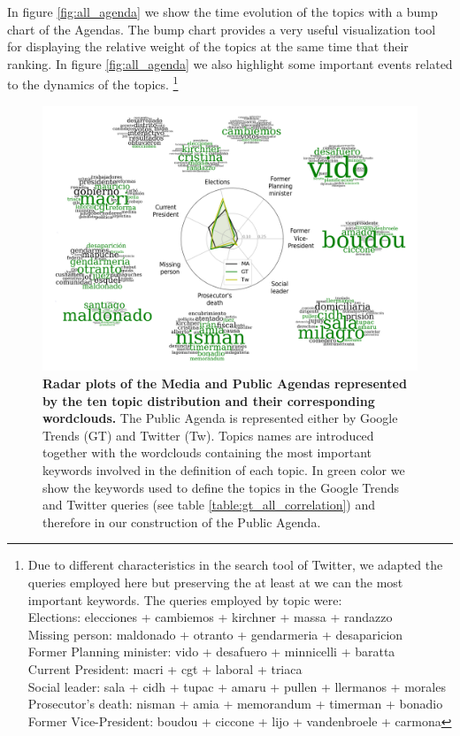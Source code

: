\documentclass[a4paper, 12pt]{article}
\begin{document}
\par In figure \ref{fig:all_agenda} we show the time evolution of the topics with a bump chart of the Agendas. The bump chart provides  a very useful visualization tool for displaying the relative weight of the topics at the same time that their ranking. In figure \ref{fig:all_agenda} we also highlight some important events related to the dynamics of the topics. \footnote{Due to different characteristics in the search tool of Twitter, we adapted the queries employed here but preserving the at least at we can the most important keywords. The queries employed by topic were: \\
Elections: elecciones + cambiemos + kirchner + massa + randazzo \\
Missing person: maldonado + otranto + gendarmeria + desaparicion \\
Former Planning minister: vido + desafuero + minnicelli + baratta \\
Current President: macri + cgt + laboral +  triaca \\
Social leader:  sala + cidh + tupac + amaru + pullen + llermanos + morales \\
Prosecutor’s death: nisman + amia + memorandum + timerman +  bonadio \\
Former Vice-President:  boudou + ciccone +  lijo + vandenbroele + carmona
}

\begin{figure}[h]
\centering
\includegraphics[width = \textwidth]{images/Fig1.pdf}
\caption{\textbf{Radar plots of the Media and Public Agendas represented by the ten topic distribution and their corresponding wordclouds.} The Public Agenda is represented either by Google Trends (GT) and Twitter (Tw). 
Topics names are introduced together with the wordclouds containing the most important keywords involved in the definition of each topic. In green color we show the keywords used to define the topics in the Google Trends and Twitter queries (see table \ref{table:gt_all_correlation}) and therefore in our construction of the Public Agenda.}
\label{fig:topics_wordclouds}
\end{figure}
\end{document}
